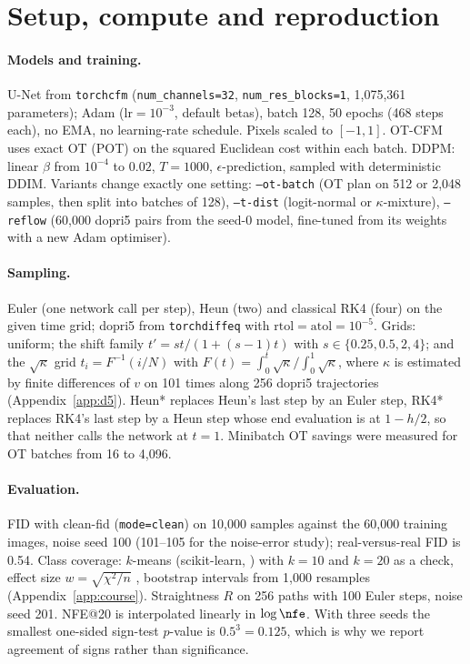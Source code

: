 \section{Setup, compute and reproduction}\label{app:setup}
\paragraph{Models and training.} U-Net from \texttt{torchcfm} (\texttt{num\_channels=32}, \texttt{num\_res\_blocks=1}, 1,075,361 parameters); Adam ($\mathrm{lr}=10^{-3}$, default betas), batch 128, 50 epochs (468 steps each), no EMA, no learning-rate schedule. Pixels scaled to $[-1,1]$. OT-CFM uses exact OT (POT) on the squared Euclidean cost within each batch. DDPM: linear $\beta$ from $10^{-4}$ to $0.02$, $T=1000$, $\epsilon$-prediction, sampled with deterministic DDIM. Variants change exactly one setting: \texttt{--ot-batch} (OT plan on 512 or 2,048 samples, then split into batches of 128), \texttt{--t-dist} (logit-normal or $\kappa$-mixture), \texttt{--reflow} (60,000 dopri5 pairs from the seed-0 model, fine-tuned from its weights with a new Adam optimiser).
\paragraph{Sampling.} Euler (one network call per step), Heun (two) and classical RK4 (four) on the given time grid; dopri5 from \texttt{torchdiffeq} with $\mathrm{rtol}=\mathrm{atol}=10^{-5}$. Grids: uniform; the shift family $t'=st/(1+(s-1)t)$ with $s\in\{0.25,0.5,2,4\}$; and the $\sqrt\kappa$ grid $t_i=F^{-1}(i/N)$ with $F(t)=\int_0^t\sqrt\kappa/\!\int_0^1\sqrt\kappa$, where $\kappa$ is estimated by finite differences of $v$ on 101 times along 256 dopri5 trajectories (Appendix~\ref{app:d5}). Heun* replaces Heun's last step by an Euler step, RK4* replaces RK4's last step by a Heun step whose end evaluation is at $1-h/2$, so that neither calls the network at $t=1$. Minibatch OT savings were measured for OT batches from 16 to 4,096.
\paragraph{Evaluation.} FID with clean-fid (\texttt{mode=clean}) on 10,000 samples against the 60,000 training images, noise seed 100 (101--105 for the noise-error study); real-versus-real FID is 0.54. %
Class coverage: $k$-means (scikit-learn, \citealp{pedregosa2011sklearn}) with $k=10$ and $k=20$ as a check, effect size $w=\sqrt{\chi^2/n}$ \citep{cohen1988power}, bootstrap intervals \citep{efron1979bootstrap} from 1,000 resamples (Appendix~\ref{app:course}). Straightness $R$ on 256 paths with 100 Euler steps, noise seed 201. NFE@20 is interpolated linearly in $\log\nfe$. With three seeds the smallest one-sided sign-test $p$-value is $0.5^3=0.125$, which is why we report agreement of signs rather than significance.
